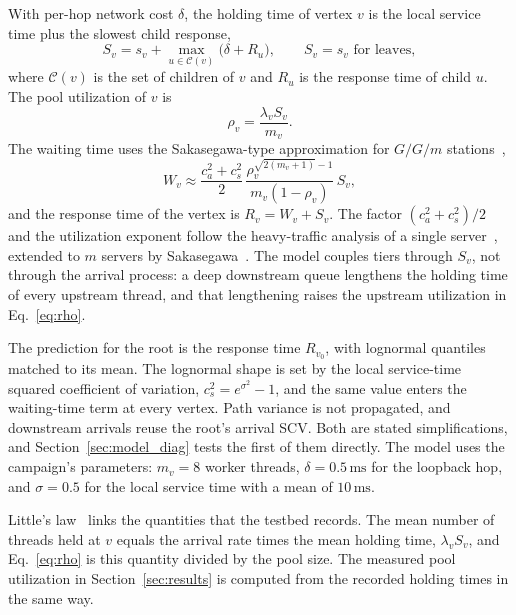 With per-hop network cost $\delta$, the holding time of vertex $v$ is the local service time plus the slowest child response,
\begin{equation}
  S_v = s_v + \max_{u\in\mathcal{C}(v)}\bigl(\delta + R_u\bigr),
  \qquad S_v = s_v \text{ for leaves},
  \label{eq:holding}
\end{equation}
where $\mathcal{C}(v)$ is the set of children of $v$ and $R_u$ is the response time of child $u$. The pool utilization of $v$ is
\begin{equation}
  \rho_v = \frac{\lambda_v S_v}{m_v}.
  \label{eq:rho}
\end{equation}
The waiting time uses the Sakasegawa-type approximation for $G/G/m$ stations~\cite{whitt1993ggm},
\begin{equation}
  W_v \approx \frac{c_a^2+c_s^2}{2}\,\frac{\rho_v^{\sqrt{2(m_v+1)}-1}}{m_v(1-\rho_v)}\,S_v,
  \label{eq:sakasegawa}
\end{equation}
and the response time of the vertex is $R_v = W_v + S_v$. The factor $(c_a^2+c_s^2)/2$ and the utilization exponent follow the heavy-traffic analysis of a single server~\cite{kingman1961single}, extended to $m$ servers by Sakasegawa~\cite{sakasegawa1977approximation}. The model couples tiers through $S_v$, not through the arrival process: a deep downstream queue lengthens the holding time of every upstream thread, and that lengthening raises the upstream utilization in Eq.~\eqref{eq:rho}.

The prediction for the root is the response time $R_{v_0}$, with lognormal quantiles matched to its mean. The lognormal shape is set by the local service-time squared coefficient of variation, $c_s^2=e^{\sigma^2}-1$, and the same value enters the waiting-time term at every vertex. Path variance is not propagated, and downstream arrivals reuse the root's arrival SCV. Both are stated simplifications, and Section~\ref{sec:model_diag} tests the first of them directly. The model uses the campaign's parameters: $m_v=8$ worker threads, $\delta=0.5\,\mathrm{ms}$ for the loopback hop, and $\sigma=0.5$ for the local service time with a mean of $10\,\mathrm{ms}$.

Little's law~\cite{little1961law} links the quantities that the testbed records. The mean number of threads held at $v$ equals the arrival rate times the mean holding time, $\lambda_v S_v$, and Eq.~\eqref{eq:rho} is this quantity divided by the pool size. The measured pool utilization in Section~\ref{sec:results} is computed from the recorded holding times in the same way.

